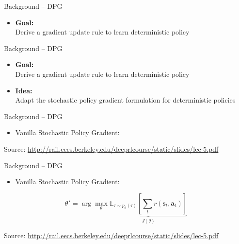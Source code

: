 \begin{frame}{Background -- DPG}
\begin{itemize}
    \item \textbf{Goal:}
    \vspace{0.5em}
    \\ Derive a gradient update rule to learn deterministic policy
\end{itemize}
\end{frame}

\begin{frame}{Background -- DPG}
\begin{itemize}
    \item \textbf{Goal:}
    \vspace{0.5em}
    \\ Derive a gradient update rule to learn deterministic policy
    \vspace{1em}
    \item \textbf{Idea:}
    \vspace{0.5em}
    \\ Adapt the stochastic policy gradient formulation for deterministic policies
\end{itemize}
\end{frame}
\begin{frame}{Background -- DPG}
\begin{itemize}
    \item Vanilla Stochastic Policy Gradient:
\end{itemize}
\vfill
\begin{flushright}
    \tiny Source: \url{http://rail.eecs.berkeley.edu/deeprlcourse/static/slides/lec-5.pdf}
\end{flushright}
\end{frame}

\begin{frame}{Background -- DPG}
\begin{itemize}
    \item Vanilla Stochastic Policy Gradient:
\end{itemize}
\[
\theta^{\star} = \arg\max_{\theta} \underbrace{\mathbb{E}_{\tau \sim p_\theta(\tau)}\!\left[ \sum_t r(\mathbf{s}_t, \mathbf{a}_t) \right]}_{J(\theta)}
\]
\vfill
\begin{flushright}
    \tiny Source: \url{http://rail.eecs.berkeley.edu/deeprlcourse/static/slides/lec-5.pdf}
\end{flushright}
\end{frame}

